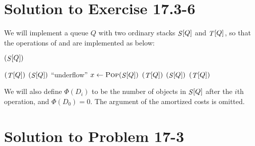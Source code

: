\documentclass[a4paper, fleqn]{article}
\begin{document}
\section*{Solution to Exercise 17.3-6}

We will implement a queue $Q$ with two ordinary stacks $\id{S}[Q]$ and
$\id{T}[Q]$, so that the operations of  and
 are implemented as below:

\begin{codebox}
\li {}$(\id{S}[Q])$
\end{codebox}

\begin{codebox}
\li \If {}$(\id{T}[Q])$
\li   \Then
        \If {}$(\id{S}[Q])$
\li       \Then
            \Error ``underflow''
\li       \Else
            \Repeat
\li           $x \gets \proc{Pop}(\id{S}[Q])$
\li           {}$(\id{T}[Q])$
\li         \Until {}$(\id{S}[Q])$
          \End
      \End
\li \Return {}$(\id{T}[Q])$
\end{codebox}

We will also define $\Phi(D_i)$ to be the number of objects in
$\id{S}[Q]$ after the $i$th operation, and $\Phi(D_0) = 0$. The
argument of the amortized costs is omitted.






\section*{Solution to Problem 17-3}
\end{document}
